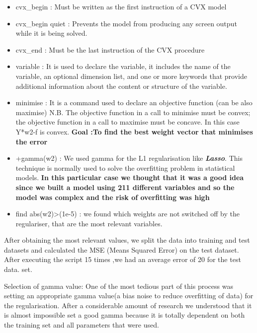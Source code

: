 \begin{itemize}
\item cvx\_begin : Must be written as the first instruction of a CVX model
\item cvx\_begin quiet : Prevents the model from producing any screen output while it is being solved.
\item cvx\_end : Must be the last instruction of the CVX procedure 
\item variable : It is used to declare the variable, it includes the name of the variable, an optional dimension list, and one or more keywords that provide additional information about the content or structure of the variable.
\item minimise : It is a command used to declare an objective function (can be also maximise) 
N.B. The objective function in a call to minimise must be convex; the objective function in a call to maximise must be concave. In this case Y*w2-f is convex.
\newline
\textbf{Goal :To find the best weight vector that minimises the error }
\item +gamma(w2) : We used gamma for the L1 regularisation like \textit{\textbf{Lasso}}. This technique is normally used to solve the overfitting problem in statistical models. \textbf{In this particular case we thought that it was a good idea since we built a model using 211 different variables and so the model was complex and the risk of overfitting was high}
\item find abs(w2)\textgreater(1e-5) : we found which weights are not switched off by the regulariser, that are the most relevant variables. 
\end{itemize}

After obtaining the most relevant values, we split the data into training and test datasets and calculated the MSE (Means Squared Error) on the test dataset. After executing the script 15 times ,we had an average error of 20 for the test data. set\cite{rossi2013exchange}. 

Selection of gamma value:
\newline
One of the most tedious part of this process was setting an appropriate gamma value(a bias noise to reduce overfitting of data) for the regularisation. After a considerable amount of research we understood that it is almost impossible set a good gamma because it is totally dependent on both the training set and all parameters that were used\cite{philip2011artificial}. 

